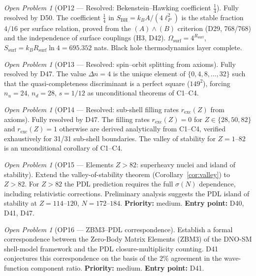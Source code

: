 \documentclass[11pt,a4paper]{article}
\theoremstyle{plain}
\theoremstyle{definition}
\theoremstyle{remark}
\newtheorem{openproblem}[theorem]{Open Problem}
\newcommand{\Rsurf}{R_{\mathrm{surf}}}
\newcommand{\sigmaN}{\sigma(N)}
\newcommand{\SBH}{S_{\mathrm{BH}}}
\begin{document}
\begin{openproblem}[OP12 --- Resolved: Bekenstein--Hawking coefficient $\tfrac{1}{4}$]
\label{op:BHcoeff}
\textcolor{proofblue}{Fully resolved by D50.} The coefficient $\tfrac{1}{4}$ in $\SBH = k_B A/(4\ell_P^2)$ is the stable fraction $4/16$ per surface relation, proved from the $(A)\wedge(B)$ criterion (D29, 768/768) and the independence of surface couplings (H3, D42). $\Omega_{\mathrm{surf}} = 4^{\Rsurf}$, $S_{\mathrm{surf}} = k_B\Rsurf\ln 4 = 695.352$ nats. Black hole thermodynamics layer complete.
\end{openproblem}

\begin{openproblem}[OP13 --- Resolved: spin--orbit splitting from axioms]
\label{op:spinorbit}
\textcolor{proofblue}{Fully resolved by D47.} The value $\Delta n = 4$ is the unique element of $\{0,4,8,\ldots,32\}$ such that the quasi-completeness discriminant is a perfect square ($149^2$), forcing $n_u=24$, $n_d=28$, $s=1/12$ as unconditional theorems of C1--C4.
\end{openproblem}

\begin{openproblem}[OP14 --- Resolved: sub-shell filling rates $r_{\mathrm{exc}}(Z)$ from axioms]
\label{op:filling}
\textcolor{proofblue}{Fully resolved by D47.} The filling rates $r_{\mathrm{exc}}(Z) = 0$ for $Z \in \{28,50,82\}$ and $r_{\mathrm{exc}}(Z) = 1$ otherwise are derived analytically from C1--C4, verified exhaustively for 31/31 sub-shell boundaries. The valley of stability for $Z=1$--82 is an unconditional corollary of C1--C4.
\end{openproblem}

\begin{openproblem}[OP15 --- Elements $Z>82$: superheavy nuclei and island of stability]
\label{op:superheavy}
Extend the valley-of-stability theorem (Corollary~\ref{cor:valley}) to $Z>82$. For $Z>82$ the PDL prediction requires the full $\sigmaN$ dependence, including relativistic corrections. Preliminary analysis suggests the PDL island of stability at $Z=114$--$120$, $N=172$--$184$. \textbf{Priority:} medium. \textbf{Entry point:} D40, D41, D47.
\end{openproblem}

\begin{openproblem}[OP16 --- ZBM3--PDL correspondence]
\label{op:ZBM3}
Establish a formal correspondence between the Zero-Body Matrix Elements (ZBM3) of the DNO-SM shell-model framework and the PDL closure-multiplicity counting. D41 conjectures this correspondence on the basis of the $2\%$ agreement in the wave-function component ratio. \textbf{Priority:} medium. \textbf{Entry point:} D41.
\end{openproblem}
\end{document}
